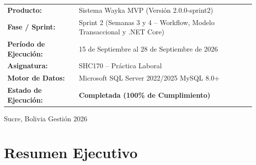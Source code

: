 \documentclass[a4paper,12pt]{article}
\newcommand{\dotnet}{\mbox{.NET}}
\begin{document}
\begin{titlepage}
\begin{center}
        \vspace{2.2cm}

        \begin{tcolorbox}[
            colback=colorGrisFondo,
            colframe=colorAzul,
            arc=3mm,
            width=0.92\linewidth,
            boxrule=1.2pt
        ]
            \centering
            \vspace{0.2cm}
            \begin{tabularx}{\linewidth}{@{}lY@{}}
                \textbf{\color{colorAzul}Producto:} & Sistema Wayka MVP (Versión 2.0.0-sprint2) \\
                \textbf{\color{colorAzul}Fase / Sprint:} & Sprint 2 (Semanas 3 y 4 -- Workflow, Modelo Transaccional y \dotnet{} Core) \\
                \textbf{\color{colorAzul}Período de Ejecución:} & 15 de Septiembre al 28 de Septiembre de 2026 \\
                \textbf{\color{colorAzul}Asignatura:} & SHC170 -- Práctica Laboral \\
                \textbf{\color{colorAzul}Motor de Datos:} & Microsoft SQL Server 2022/2025 \textbar{} MySQL 8.0+ \\
                \textbf{\color{colorAzul}Estado de Ejecución:} & \textbf{\color{colorExito}Completada (100\% de Cumplimiento)}
            \end{tabularx}
            \vspace{0.2cm}
        \end{tcolorbox}
    \end{center}

    \vfill

    \begin{center}
        \small\color{colorTextoMuted}
        Sucre, Bolivia \textbar{} Gestión 2026
    \end{center}
\end{titlepage}
\hypersetup{pageanchor=true}

\newpage
\tableofcontents
\newpage

\section{Resumen Ejecutivo}
\end{document}
